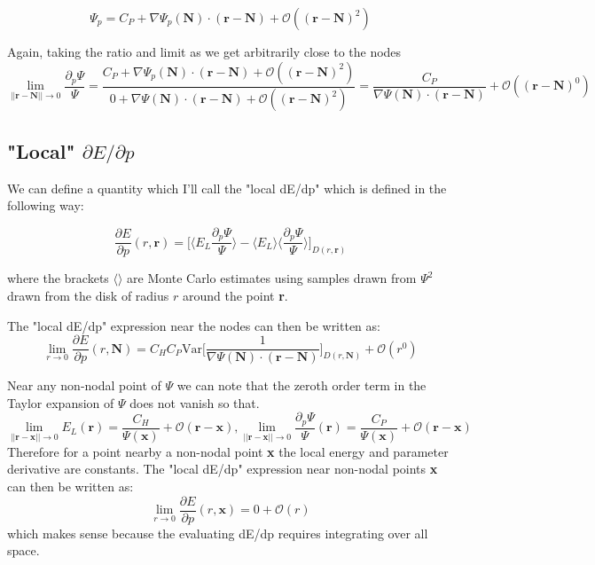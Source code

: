 \documentclass{article}
\begin{document}
$$\Psi_p = C_P  + \nabla \Psi_p(\textbf{N})\cdot (\textbf{r} - \textbf{N}) + \mathcal{O}((\textbf{r}-\textbf{N})^2)$$

Again, taking the ratio and limit as we get arbitrarily close to the nodes
$$\lim_{||\textbf{r}-\textbf{N}||\rightarrow 0} \frac{\partial_p \Psi}{\Psi} = \frac{C_P  + \nabla \Psi_p(\textbf{N})\cdot (\textbf{r} - \textbf{N}) + \mathcal{O}((\textbf{r}-\textbf{N})^2)}{0  + \nabla \Psi(\textbf{N})\cdot (\textbf{r} - \textbf{N}) + \mathcal{O}((\textbf{r}-\textbf{N})^2)} =\frac{C_P}{\nabla \Psi(\textbf{N})\cdot (\textbf{r} - \textbf{N})} + \mathcal{O}((\textbf{r}-\textbf{N})^0)$$

\subsection{"Local" $\partial E/\partial p$}
We can define a quantity which I'll call the "local dE/dp" which is defined in the following way:

$$\frac{\partial E}{\partial p}(r,\textbf{r}) = \Bigg[ \langle E_L \frac{\partial_p \Psi}{\Psi} \rangle - \langle E_L \rangle \langle \frac{\partial_p \Psi}{\Psi} \rangle \Bigg]_{D(r,\textbf{r})} $$

where the brackets $\langle \rangle$ are Monte Carlo estimates using samples drawn from $\Psi^2$ drawn from the disk of radius $r$ around the point \textbf{r}.

The "local dE/dp" expression near the nodes can then be written as:\begin{equation}
\boxed{\lim_{r \rightarrow 0} \frac{\partial E}{\partial p}(r,\textbf{N}) = C_HC_P \text{Var}\Big[\frac{1}{\nabla \Psi(\textbf{N})\cdot (\textbf{r} - \textbf{N})}\Big]_{D(r,\textbf{N})} + \mathcal{O}(r^0)}
\end{equation}

Near any non-nodal point of $\Psi$ we can note that the zeroth order term in the Taylor expansion of $\Psi$ does not vanish so that.
$$\lim_{||\textbf{r} - \textbf{x}||\rightarrow 0} E_L(\textbf{r}) = \frac{C_H}{\Psi(\textbf{x})} + \mathcal{O}(\textbf{r}-\textbf{x}), \lim_{||\textbf{r} - \textbf{x}||\rightarrow 0} \frac{\partial_p \Psi}{\Psi}(\textbf{r}) = \frac{C_P}{\Psi(\textbf{x})} + \mathcal{O}(\textbf{r}-\textbf{x}) $$
Therefore for a point nearby a non-nodal point \textbf{x} the local energy and parameter derivative are constants. The "local dE/dp" expression near non-nodal points \textbf{x} can then be written as:
\begin{equation} \boxed{\lim_{r \rightarrow 0} \frac{\partial E}{\partial p}(r,\textbf{x}) = 0 + \mathcal{O}(r)}
\end{equation}
which makes sense because the evaluating dE/dp requires integrating over all space.
\end{document}
